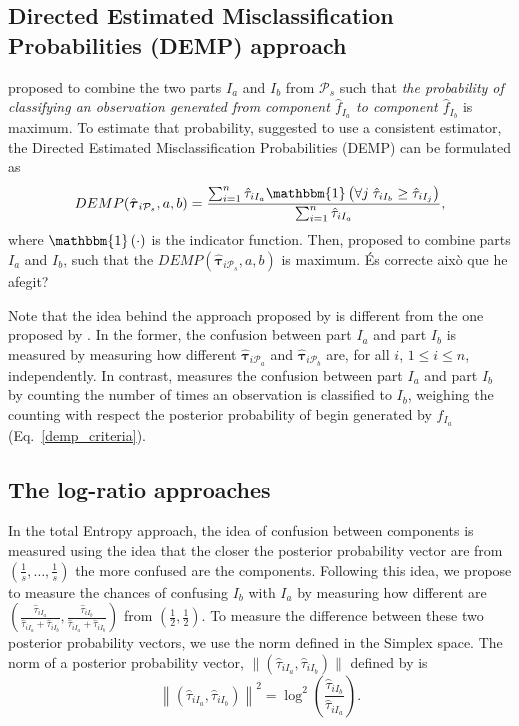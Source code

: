 \documentclass[10pt, a4paper]{article}
\newcommand{\m}[1]{\boldsymbol{#1}}
\begin{document}
\begin{spacing}{1.9}
\subsection{Directed Estimated Misclassification Probabilities (DEMP) approach}

\cite{hennig2010methods} proposed to combine the two parts $I_a$ and $I_b$ from $ \mathcal{P}_s$ such that \emph{the probability of classifying an observation generated from component $\hat{f}_{I_a}$ to component $\hat{f}_{I_b}$} is maximum. To estimate that probability,  \cite{hennig2010methods} suggested to use a consistent estimator, the Directed Estimated Misclassification Probabilities (DEMP) can be formulated as
\begin{equation}\label{demp_criteria}
DEMP(\hat{\m \tau}_{i \mathcal{P}_s}, a, b) =\frac{ \sum_{i=1}^n {\hat{\tau}_{i I_a} \mathbbm{1}\left( \forall j\; \hat{\tau}_{i I_{b}} \geq \hat{\tau}_{i I_j} \right)}}{\sum_{i=1}^n \hat{\tau}_{i I_a} },
\end{equation}
where $\mathbbm{1}\left( \cdot \right)$ is the indicator function. Then, \cite{hennig2010methods} proposed to combine parts $I_a$ and $I_b$, such that the $DEMP(\hat{\m \tau}_{i \mathcal{P}_s}, a, b)$ is maximum. {\color{blue} \'{E}s correcte aix\`{o} que he afegit?} 

Note that the idea behind the approach proposed by \cite{baudry2010combining} is different from the one proposed by \cite{hennig2010methods}. In the former, the confusion between part $I_a$ and part $I_b$ is measured by measuring how different $\hat{\m \tau}_{i \mathcal{P}_a}$ and $\hat{\m \tau}_{i \mathcal{P}_b}$ are, for all $i$, $1\leq i \leq n$, independently. In contrast, \cite{hennig2010methods} measures the confusion between part $I_a$ and part $I_b$ by counting the number of times an observation is classified to $I_b$, weighing the counting with respect the posterior probability of begin generated by $\hat{f}_{I_a}$ (Eq.~\ref{demp_criteria}).

\subsection{The log-ratio approaches}
\label{lr_approach}

In the total Entropy approach, the idea of confusion between components is measured using the idea that the closer the posterior probability vector are from $(\frac{1}{s}, \dots, \frac{1}{s})$ the more confused are the components. Following this idea, we propose to measure the chances of confusing $I_b$ with $I_a$  by measuring how different are $(\frac{\hat{\tau}_{i I_a}}{\hat{\tau}_{i I_a} + \hat{\tau}_{i I_b}}, \frac{\hat{\tau}_{i I_b}}{\hat{\tau}_{i I_a} + \hat{\tau}_{i I_b}})$ from $(\frac{1}{2}, \frac{1}{2})$. To measure the difference between these two posterior probability vectors, we use the norm defined in the Simplex space. The norm of a posterior probability vector, $\| (\hat{\tau}_{iI_a}, \hat{\tau}_{iI_b}) \|$  defined by \cite{aitchison2002simplicial} is
\[
\left\| (\hat{\tau}_{iI_a}, \hat{\tau}_{iI_b}) \right\|^2 = \log^2 \left(\frac{ \hat{\tau}_{iI_b} }{ \hat{\tau}_{iI_a} }\right).
\]


\end{spacing}
\end{document}

